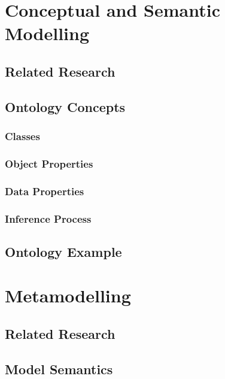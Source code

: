 \documentclass[12pt,a4paper,draft]{report}
\begin{document}
\section{Conceptual and Semantic Modelling}


\subsection{Related Research}


\subsection{Ontology Concepts}

\subsubsection{Classes}

\subsubsection{Object Properties}

\subsubsection{Data Properties}

\subsubsection{Inference Process}


\subsection{Ontology Example}



\section{Metamodelling}


\subsection{Related Research}


\subsection{Model Semantics}
\end{document}
